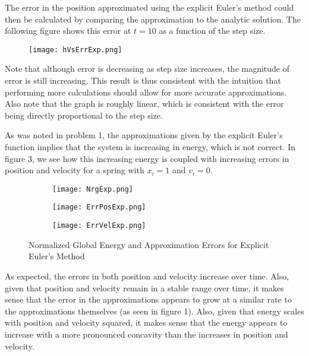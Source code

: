 \documentclass[10pt]{article}
\newenvironment{problem}[2][Problem]{\begin{trivlist}
\item[\hskip \labelsep {\bfseries #1}\hskip \labelsep {\bfseries #2.}]}{\end{trivlist}}
\begin{document}
\begin{problem}{3}
The error in the position approximated using the explicit Euler's method could then be calculated by comparing the approximation to the analytic solution. The following figure shows this error at $t=10$ as a function of the step size. 
\begin{figure}[h]
\centering
\texttt{[image: hVsErrExp.png]}
\caption{}
\end{figure}

Note that although error is decreasing as step size increases, the magnitude of error is still increasing. This result is thus consistent with the intuition that performing more calculations should allow for more accurate approximations. Also note that the graph is roughly linear, which is consistent with the error being directly proportional to the step size.
\end{problem}

\begin{problem}{4}
As was noted in problem 1, the approximations given by the explicit Euler's function implies that the system is increasing in energy, which is not correct. In figure 3, we see how this increasing energy is coupled with increasing errors in position and velocity for a spring with $x_i=1$ and $v_i=0$.

\begin{figure}[h]
\centering
\begin{subfigure}{.3\textwidth}
  \centering
  \texttt{[image: NrgExp.png]}
\end{subfigure}%
\begin{subfigure}{.3\textwidth}
  \centering
  \texttt{[image: ErrPosExp.png]}
\end{subfigure}
\begin{subfigure}{.3\textwidth}
  \centering
  \texttt{[image: ErrVelExp.png]}
\end{subfigure}
\caption{Normalized Global Energy and Approximation Errors for Explicit Euler's Method}
\end{figure}

As expected, the errors in both position and velocity increase over time. Also, given that position and velocity remain in a stable range over time, it makes sense that the error in the approximations appears to grow at a similar rate to the approximations themselves (as seen in figure 1). Also, given that energy scales with position and velocity squared, it makes sense that the energy appears to increase with a more pronounced concavity than the increases in position and velocity.
\end{problem}
\end{document}
